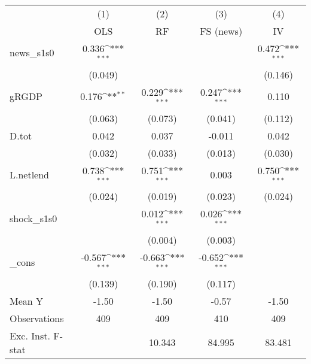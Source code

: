 {
\def\sym#1{\ifmmode^{#1}\else\(^{#1}\)\fi}
\begin{tabular}{l*{4}{c}}
\toprule
            &\multicolumn{1}{c}{(1)}&\multicolumn{1}{c}{(2)}&\multicolumn{1}{c}{(3)}&\multicolumn{1}{c}{(4)}\\
            &\multicolumn{1}{c}{OLS}&\multicolumn{1}{c}{RF}&\multicolumn{1}{c}{FS (news)}&\multicolumn{1}{c}{IV}\\
\midrule
news\_s1s0   &       0.336\sym{***}&                     &                     &       0.472\sym{***}\\
            &     (0.049)         &                     &                     &     (0.146)         \\
\addlinespace
gRGDP       &       0.176\sym{**} &       0.229\sym{***}&       0.247\sym{***}&       0.110         \\
            &     (0.063)         &     (0.073)         &     (0.041)         &     (0.112)         \\
\addlinespace
D.tot       &       0.042         &       0.037         &      -0.011         &       0.042         \\
            &     (0.032)         &     (0.033)         &     (0.013)         &     (0.030)         \\
\addlinespace
L.netlend   &       0.738\sym{***}&       0.751\sym{***}&       0.003         &       0.750\sym{***}\\
            &     (0.024)         &     (0.019)         &     (0.023)         &     (0.024)         \\
\addlinespace
shock\_s1s0  &                     &       0.012\sym{***}&       0.026\sym{***}&                     \\
            &                     &     (0.004)         &     (0.003)         &                     \\
\addlinespace
\_cons      &      -0.567\sym{***}&      -0.663\sym{***}&      -0.652\sym{***}&                     \\
            &     (0.139)         &     (0.190)         &     (0.117)         &                     \\
\midrule
Mean Y      &       -1.50         &       -1.50         &       -0.57         &       -1.50         \\
Observations&         409         &         409         &         410         &         409         \\
Exc. Inst. F-stat&                     &      10.343         &      84.995         &      83.481         \\
\bottomrule
\end{tabular}
}
